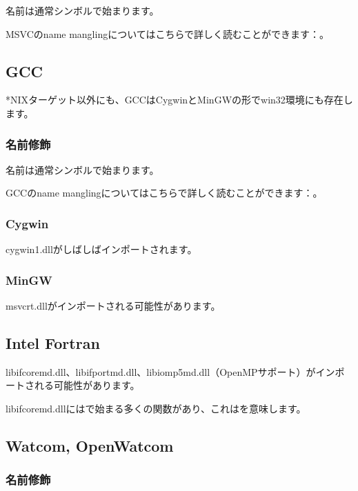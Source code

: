 名前は通常シンボルで始まります。

MSVCの\gls{name mangling}についてはこちらで詳しく読むことができます：。

\subsection{GCC}

*NIXターゲット以外にも、GCCはCygwinとMinGWの形でwin32環境にも存在します。

\subsubsection{名前修飾}

名前は通常シンボルで始まります。

GCCの\gls{name mangling}についてはこちらで詳しく読むことができます：。

\subsubsection{Cygwin}

cygwin1.dllがしばしばインポートされます。

\subsubsection{MinGW}

msvcrt.dllがインポートされる可能性があります。

\subsection{Intel Fortran}

libifcoremd.dll、libifportmd.dll、libiomp5md.dll（OpenMPサポート）がインポートされる可能性があります。

libifcoremd.dllにはで始まる多くの関数があり、これはを意味します。

\subsection{Watcom, OpenWatcom}

\subsubsection{名前修飾}

